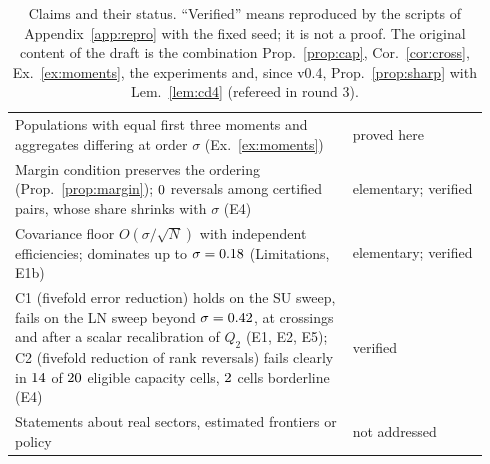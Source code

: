 \documentclass[10pt,a4paper]{article}
\theoremstyle{plain}
\theoremstyle{definition}
\theoremstyle{remark}
\begin{document}
\begin{table}[t]
\begin{tabular}{p{0.67\linewidth}p{0.27\linewidth}}
Populations with equal first three moments and aggregates differing at order $\sigma$ (Ex.~\ref{ex:moments}) & proved here\\
Margin condition preserves the ordering (Prop.~\ref{prop:margin}); $0$ reversals among certified pairs, whose share shrinks with $\sigma$ (E4) & elementary; verified\\
Covariance floor $O(\sigma/\sqrt N)$ with independent efficiencies; dominates up to $\sigma=0.18$ (Limitations, E1b) & elementary; verified\\
C1 (fivefold error reduction) holds on the SU sweep, fails on the LN sweep beyond $\sigma=0.42$, at crossings and after a scalar recalibration of $Q_2$ (E1, E2, E5); C2 (fivefold reduction of rank reversals) fails clearly in $14$ of $20$ eligible capacity cells, $2$ cells borderline (E4) & verified\\
Statements about real sectors, estimated frontiers or policy & not addressed\\
\bottomrule
\end{tabular}
\caption{Claims and their status. ``Verified'' means reproduced by the scripts of Appendix~\ref{app:repro} with the fixed seed; it is not a proof. The original content of the draft is the combination Prop.~\ref{prop:cap}, Cor.~\ref{cor:cross}, Ex.~\ref{ex:moments}, the experiments and, since v0.4, Prop.~\ref{prop:sharp} with Lem.~\ref{lem:cd4} (refereed in round 3).}
\label{tab:claims}
\end{table}
\end{document}
